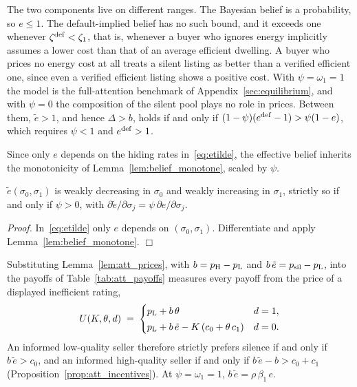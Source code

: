 The two components live on different ranges. The Bayesian belief is a probability, so $e\le1$. The default-implied belief has no such bound, and it exceeds one whenever $\zeta^{\rm def}<\zeta_1$, that is, whenever a buyer who ignores energy implicitly assumes a lower cost than that of an average efficient dwelling. A buyer who prices no energy cost at all treats a silent listing as better than a verified efficient one, since even a verified efficient listing shows a positive cost. With $\psi=\omega_1=1$ the model is the full-attention benchmark of Appendix~\ref{sec:equilibrium}, and with $\psi=0$ the composition of the silent pool plays no role in prices. Between them, $\tilde e>1$, and hence $\Delta>b$, holds if and only if $(1-\psi)(e^{\rm def}-1)>\psi(1-e)$, which requires $\psi<1$ and $e^{\rm def}>1$.

Since only $e$ depends on the hiding rates in~\eqref{eq:etilde}, the effective belief inherits the monotonicity of Lemma~\ref{lem:belief_monotone}, scaled by $\psi$.

\begin{lemma}
\label{lem:etilde_monotone}
$\tilde e(\sigma_0,\sigma_1)$ is weakly decreasing in $\sigma_0$ and weakly increasing in $\sigma_1$, strictly so if and only if $\psi>0$, with $\partial\tilde e/\partial\sigma_j=\psi\,\partial e/\partial\sigma_j$.
\end{lemma}

\noindent\textit{Proof.} In~\eqref{eq:etilde} only $e$ depends on $(\sigma_0,\sigma_1)$. Differentiate and apply Lemma~\ref{lem:belief_monotone}. $\Box$

Substituting Lemma~\ref{lem:att_prices}, with $b=p_{\rm H}-p_{\rm L}$ and $b\,\tilde e=p_{\rm sil}-p_{\rm L}$, into the payoffs of Table~\ref{tab:att_payoffs} measures every payoff from the price of a displayed inefficient rating,
\begin{equation}
    U(K,\theta,d)\;=\;
    \begin{cases}
        p_{\rm L}+b\,\theta & d=1,\\[2pt]
        p_{\rm L}+b\,\tilde e-K\,(c_0+\theta\,c_1) & d=0.
    \end{cases}
    \label{eq:seller_payoff_concrete}
\end{equation}
An informed low-quality seller therefore strictly prefers silence if and only if $b\,\tilde e>c_0$, and an informed high-quality seller if and only if $b\,\tilde e-b>c_0+c_1$ (Proposition~\ref{prop:att_incentives}). At $\psi=\omega_1=1$, $b\,\tilde e=\rho\,\beta_1\,e$.

